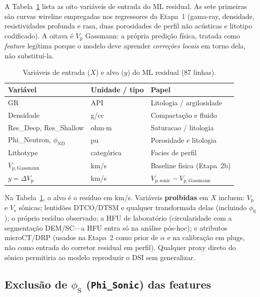 \documentclass[11pt,a4paper]{article}
\numberwithin{equation}{section}
\newcommand{\Vp}{\ensuremath{V_{\mathrm{p}}}}
\newcommand{\Vs}{\ensuremath{V_{\mathrm{s}}}}
\newcommand{\phiND}{\ensuremath{\phi_{\mathrm{ND}}}}
\newcommand{\phiS}{\ensuremath{\phi_{\mathrm{S}}}}
\begin{document}
A Tabela~\ref{tab:features} lista as oito variáveis de entrada do ML residual.
As sete primeiras são curvas wireline empregadas nos regressores da
Etapa~1 (gama-ray, densidade, resistividades profunda e rasa, duas porosidades
de perfil não acústicas e litotipo codificado).
A oitava é \Vp{} Gassmann: a própria predição física, tratada como
\emph{feature} legítima porque o modelo deve aprender \emph{correções
locais} em torno dela, não substituí-la.

\begin{table}[H]
  \centering
  \caption{Variáveis de entrada ($X$) e alvo ($y$) do ML residual (87 linhas).}
  \label{tab:features}
  \begin{tabular}{llp{6.5cm}}
    \toprule
    Variável & Unidade / tipo & Papel \\
    \midrule
    GR & API & Litologia / argilosidade \\
    Densidade & g/cc & Compactação e fluido \\
    Res\_Deep, Res\_Shallow & ohm$\cdot$m & Saturacao / litologia \\
    Phi\_Neutron, \phiND{} & pu & Porosidade e litologia \\
    Lithotype & categórica & Facies de perfil \\
    $V_{\mathrm{p,Gassmann}}$ & km/s & Baseline física (Etapa~2b) \\
    \midrule
    $y = \Delta V_{\mathrm{p}}$ & km/s & $V_{\mathrm{p,sonic}} - V_{\mathrm{p,Gassmann}}$ \\
    \bottomrule
  \end{tabular}
\end{table}

Na Tabela~\ref{tab:features}, o alvo é o resíduo em km/s.
Variáveis \textbf{proibidas} em $X$ incluem: \Vp{} e \Vs{} sônicas;
lentidões DTCO/DTSM e qualquer transformada delas (incluindo \phiS{});
o próprio resíduo observado; a HFU de laboratório (circularidade com a
segmentação DEM/SC---a HFU entra só na análise pós-hoc); e atributos
microCT/DRP (usados na Etapa~2 como prior de $\alpha$ e na calibração em
plugs, não como entrada do corretor residual em perfil).
Qualquer proxy direto do sônico permitiria ao modelo reproduzir o DSI
sem generalizar.

\subsection{Exclusão de \phiS{} (\texttt{Phi\_Sonic}) das features}
\label{sec:phi_sonic}
\end{document}
